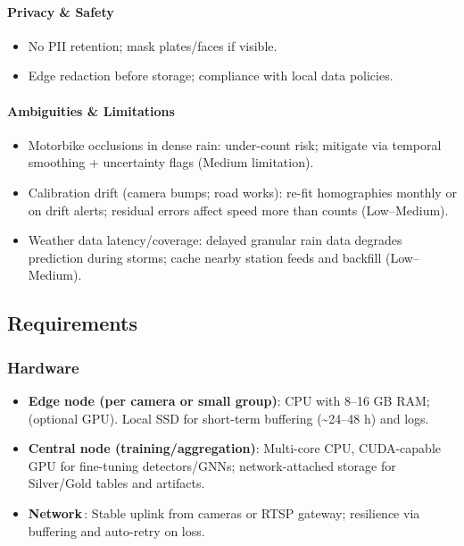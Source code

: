 \paragraph{Privacy \& Safety}


\begin{itemize}
  \item No PII retention; mask plates/faces if visible.
  \item Edge redaction before storage; compliance with local data policies.
\end{itemize}


\paragraph{Ambiguities \& Limitations}
\begin{itemize}
  \item Motorbike occlusions in dense rain: under-count risk; mitigate via temporal smoothing + uncertainty flags (Medium limitation).
  \item Calibration drift (camera bumps; road works): re-fit homographies monthly or on drift alerts; residual errors affect speed more than counts (Low--Medium).
  \item Weather data latency/coverage: delayed granular rain data degrades prediction during storms; cache nearby station feeds and backfill (Low--Medium).
\end{itemize}

\subsection{Requirements}
\subsubsection{Hardware}
\begin{itemize}
  \item \textbf{Edge node (per camera or small group)}: CPU with 8--16 GB RAM; (optional GPU). Local SSD for short-term buffering (\textasciitilde24--48 h) and logs.
  \item \textbf{Central node (training/aggregation)}: Multi-core CPU, CUDA-capable GPU for fine-tuning detectors/GNNs; network-attached storage for Silver/Gold tables and artifacts.
  \item \textbf{Network}\,: Stable uplink from cameras or RTSP gateway; resilience via buffering and auto-retry on loss.
\end{itemize}

